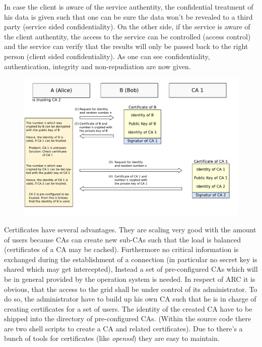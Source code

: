 In case the client is aware of the service authentity, the confidential treatment of his data is given such that one can be sure the data won't be revealed to a third party (service sided confidentiality). 
On the other side, if the service is aware of the client authentity, the access to the service can be controlled (access control) and the service can verify that the results will only be passed back to the right person (client sided confidentiality). 
As one can see confidentiality, authentication, integrity and non-repudiation are now given.\\
\begin{figure}[htb]
	\centering%
	\includegraphics[width=13cm]{tex_tls_echoservice/verification.pdf}
	\label{fig:verification_of_certificates}
\end{figure}



Certificates have several advantages. They are scaling very good with the amount of users because CAs can create new sub-CAs such that the load is balanced (certificates of a CA may be cached). Furthermore no critical information is exchanged during the establishment of a connection (in particular no secret key is shared which may get intercepted),
Instead a set of pre-configured CAs which will be in general provided by the operation system is needed.
In respect of ARC it is obvious, that the access to the grid shall be under control of its administrator. To do so, the administrator have to build up his own CA such that he is in charge of creating certificates for a set of users. 
The identity of the created CA have to be shipped into the directory of pre-configured CAs.
(Within the source code there are two shell scripts to create a CA and related certificates). Due to there's a bunch of tools for certificates (like \textit{openssl}) they are easy to maintain.\\



